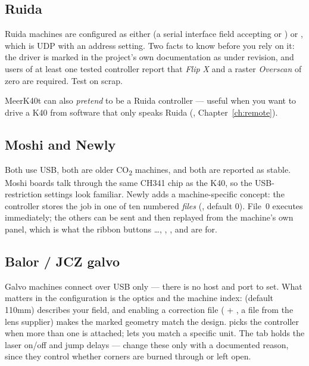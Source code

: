 \subsection*{Ruida}

Ruida machines are configured as either  (a serial interface field
accepting  or ) or , which is UDP
with an address setting. Two facts to know before you rely on it: the driver is
marked in the project's own documentation as under revision, and users of at
least one tested controller report that \emph{Flip X} and a raster
\emph{Overscan} of zero are required. Test on scrap.

MeerK40t can also \emph{pretend} to be a Ruida controller --- useful when you want
to drive a K40 from software that only speaks Ruida
(, Chapter~\ref{ch:remote}).

\subsection*{Moshi and Newly}

Both use USB, both are older CO\textsubscript{2} machines, and both are
reported as stable. Moshi boards talk through the same CH341 chip as the K40, so
the USB-restriction settings look familiar. Newly adds a machine-specific
concept: the controller stores the job in one of ten numbered \emph{files}
(, default 0). File~0 executes immediately; the others can be
sent and then replayed from the machine's own panel, which is what the ribbon
buttons \dots{}, , ,
 and  are for.

\subsection*{Balor / JCZ galvo}

Galvo machines connect over USB only --- there is no host and port to set. What
matters in the configuration is the optics and the machine index:
 (default 110\unit{mm}) describes your field, and enabling a
correction file ( + , a  file from the lens
supplier) makes the marked geometry match the design.  picks the controller when more than one is attached;  lets you match a specific unit. The  tab holds the
laser on/off and jump delays --- change these only with a documented reason, since
they control whether corners are burned through or left open.

